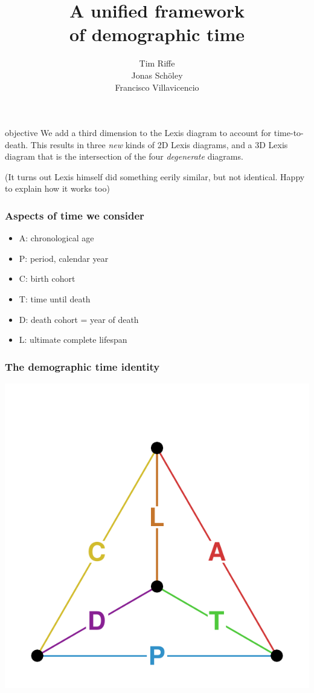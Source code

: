 \documentclass[20pt]{beamer}
\title{A unified framework\\ of demographic time}
\subtitle{Tim Riffe \\ Jonas Sch{\"o}ley \\ Francisco Villavicencio}		%
\begin{document}

\begin{frame}
	\titlepage
\end{frame}
\begin{frame}
\begin{block}{objective}
We add a third dimension to the Lexis diagram to account for time-to-death. This
results in three \textit{new} kinds of 2D Lexis diagrams, and a 3D Lexis diagram
that is the intersection of the four \textit{degenerate} diagrams.
\end{block}
\color{mygray}(It turns out Lexis himself did something eerily similar, but not
identical. Happy to explain how it works too)

\end{frame}
\begin{frame}
\frametitle{Aspects of time we consider}
\begin{itemize}[<+->]
  \item A: chronological age
  \item P: period, calendar year
  \item C: birth cohort
  \item T: time until death
  \item D: death cohort = year of death
  \item L: ultimate complete lifespan
\end{itemize}
\end{frame}


\begin{frame}
\frametitle{The demographic time identity}
\vspace{-4em}
\begin{center}
\includegraphics[scale=1.7]{Figures/TetraHedronEdgesOnly.pdf}
\end{center}
\end{frame}
\end{document}
